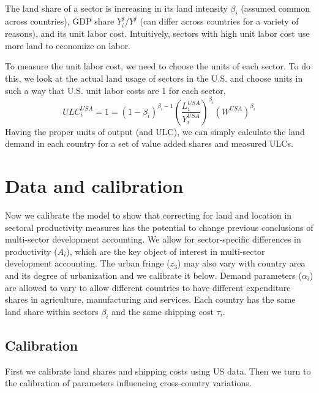 \documentclass[12pt]{article}
\begin{document}
The land share of a sector is increasing in its land intensity $\beta_i$ (assumed common across countries), GDP share ${Y_i^j}/{Y^j}$ (can differ across countries for a variety of reasons), and its unit labor cost. Intuitively, sectors with high unit labor cost use more land to economize on labor.

To measure the unit labor cost, we need to choose the units of each sector. To do this, we look at the actual land usage of sectors in the U.S. and choose units in such a way that U.S. unit labor costs are 1 for each sector,
\begin{equation}
\label{eq:US_ULC}
ULC_i^{USA} =1=(1-\beta_i)^{\beta_i-1} \left(\frac{L_i^{USA}}{Y_i^{USA}}\right)^{\beta_i}(W^{USA})^{\beta_i}
\end{equation}
Having the proper units of output (and ULC), we can simply calculate the land demand in each country for a set of value added shares and measured ULCs.

\section{Data and calibration}
Now we calibrate the model to show that correcting for land and location in sectoral productivity measures has the potential to change previous conclusions of multi-sector development accounting.
We allow for sector-specific differences in productivity ($A_i$), which are the key object of interest in multi-sector development accounting. The urban fringe ($z_3$) may also vary with country area and its degree of urbanization and we calibrate it below. Demand parameters ($\alpha_i$) are allowed to vary to allow different countries to have different expenditure shares in agriculture, manufacturing and services. %
Each country has the same land share within sectors $\beta_i$ and the same shipping cost $\tau_i$.

\subsection{Calibration}
First we calibrate land shares and shipping costs using US data. Then we turn to the calibration of parameters influencing cross-country variations.
\end{document}
